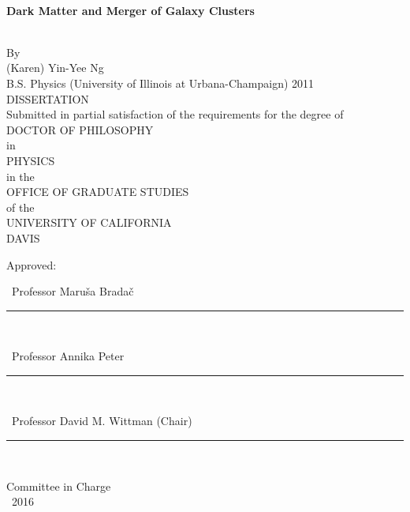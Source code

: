 \singlespacing

~\vspace{-0.75in} %
\begin{center}

  \begin{large}
    {\bf Dark Matter and Merger of Galaxy Clusters}
  \end{large}\\\n
  By\\\n
  {\sc (Karen) Yin-Yee Ng}\\
  B.S. Physics (University of Illinois at Urbana-Champaign) 2011\\
  DISSERTATION\\\n
  Submitted in partial satisfaction of the requirements for the degree of\\\n
  DOCTOR OF PHILOSOPHY\\\n
  in\\\n
  PHYSICS\\\n
  in the\\\n
  OFFICE OF GRADUATE STUDIES\\\n
  of the\\\n
  UNIVERSITY OF CALIFORNIA\\\n
  DAVIS\\\n\n
  
  Approved:\\\n\n
  
  ~Professor Maru{\v s}a Brada{\v c}\\
  \rule{4in}{1pt}\\\n\n  

  ~Professor Annika Peter\\
  \rule{4in}{1pt}\\\n\n  

  ~Professor David M. Wittman (Chair)\\
  \rule{4in}{1pt}\\

  \vfill
  
  Committee in Charge\\
  ~2016
  
\end{center}

